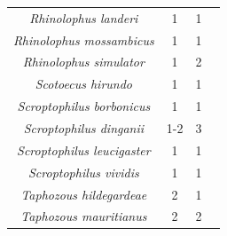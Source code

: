 \documentclass[9pt,twoside,lineno]{pnas-new}
\begin{document}
\begin{longtable}{cccp{5cm}}
\textit{Rhinolophus landeri} & 1 & 1 & \cite{Menzies1973ANigeria}\\
\textit{Rhinolophus mossambicus} & 1 & 1 & \cite{Cotterill1998FemaleZimbabwe}\\
\textit{Rhinolophus simulator} & 1 & 2 & \cite{Cotterill1998FemaleZimbabwe,OShea1980EcologicalCommunity}\\
\textit{Scotoecus hirundo} & 1 & 1 & \cite{OShea1980EcologicalCommunity}\\
\textit{Scroptophilus borbonicus} & 1 & 1 & \cite{VanderMerweN.J.Rautenbach1988AVespertilionidae}\\
\textit{Scroptophilus dinganii} & 1-2 & 3 & \cite{OShea1980EcologicalCommunity,vanderMerwe2006Aspects1833,Okia1987ReproductiveBats}\\
\textit{Scroptophilus leucigaster} & 1 & 1 & \cite{Barclay1985NoLeucogastere}\\
\textit{Scroptophilus vividis} & 1 & 1 & \cite{VanderMerweN.J.Rautenbach1988AVespertilionidae}\\
\textit{Taphozous hildegardeae} & 2 & 1 & \cite{McWilliam1988TheTropics}\\
\textit{Taphozous mauritianus} & 2 & 2 & \cite{Happold1990ReproductiveAfrica,OShea1980EcologicalCommunity}\\
\end{longtable}
\FloatBarrier
\end{document}
